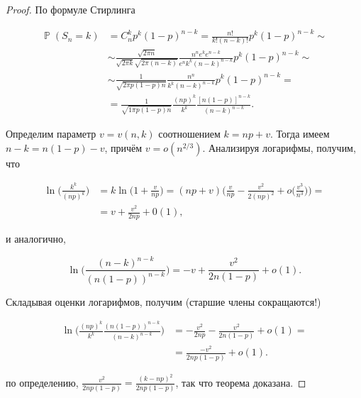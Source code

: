 \documentclass[a4paper,100pt]{article}
\theoremstyle{indented}
\theoremstyle{definition}
\theoremstyle{remark}
\DeclareMathOperator{\PP}{\mathbb{P}}
\begin{document}
\begin{proof}
  По формуле Стирлинга

  \begin{equation*}
    \begin{aligned}
      \PP(S_n = k) & = C_n^k p^k (1-p)^{n-k} = \frac{n!}{k!(n-k)!}p^k (1-p)^{n-k} \sim \\ 
      & \sim \frac{\sqrt{2 \pi n}}{\sqrt{2\pi k}\sqrt{2 \pi (n-k)}}\frac{n^n e^k e^{n-k}}{e^n k^k (n-k)^{n-k}}p^k (1-p)^{n-k} \sim \\ 
      & \sim \frac{1}{\sqrt{2 \pi p (1-p)n}} \frac{n^n}{k^k (n-k)^{n-k}} p^k (1-p)^{n-k} = \\ 
      & = \frac{1}{\sqrt{1 \pi p (1-p) n }} \frac{(np)^k}{k^k} \frac{[n(1-p)]^{n-k}}{(n-k)^{n-k}}. 
    \end{aligned}
  \end{equation*}

  Определим параметр $v = v(n, k)$ соотношением $k = np+v$. Тогда имеем $n-k = n(1-p) - v$, причём $v = o(n^{2/3})$. Анализируя логарифмы, получим, что 

  \begin{equation*}
    \begin{aligned}
      \ln \biggl( \frac{k^k}{(np)^k} \biggr) & = k \ln \biggl( 1+ \frac{v}{np} \biggr) = (np+v) \biggl( \frac{v}{np} - \frac{v^2}{2(np)^2} + o \biggl( \frac{v^3}{n^3} \biggr) \biggr) = \\ 
      & = v+ \frac{v^2}{2np} + 0(1), 
    \end{aligned}
  \end{equation*}

  и аналогично,

  \[
    \ln \biggl( \frac{(n-k)^{n-k}}{(n(1-p))^{n-k}} \biggr) = -v+ \frac{v^2}{2n(1-p)}+ o(1). 
  \]

  Складывая оценки логарифмов, получим (старшие члены сокращаются!) 

  \begin{equation*}
    \begin{aligned}
      \ln \biggl( \frac{(np)^k}{k^k} \frac{(n(1-p))^{n-k}}{(n-k)^{n-k}} \biggr) & = - \frac{v^2}{2np} - \frac{v^2}{2n(1-p)} + o(1) = \\ 
      & = \frac{-v^2}{2np(1-p)} + o(1). 
    \end{aligned}
  \end{equation*}

  по определению, $\frac{v^2}{2np(1-p)} = \frac{(k - np)^2}{2np(1-p)}$, так что теорема доказана.
\end{proof}
\end{document}
